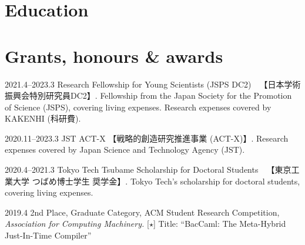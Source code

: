 \documentclass[11pt]{article} %
\newcommand{\伊澤侑祐}{\underline{伊澤侑祐}}
\begin{document}





\section*{Education}




\section*{Grants, honours \& awards}

\grant
{2021.4--2023.3}
{Research Fellowship for Young Scientists (JSPS DC2)~~【日本学術振興会特別研究員DC2】.}
{Fellowship from the Japan Society for the Promotion of Science (JSPS), covering
  living expenses. Research expenses covered by KAKENHI (科研費).}

\grant
{2020.11--2023.3}
{JST ACT-X 【戦略的創造研究推進事業 (ACT-X)】.}
{Research expenses covered by Japan Science and Technology Agency (JST).}

\grant
{2020.4--2021.3}
{Tokyo Tech Tsubame Scholarship for Doctoral Students~~【東京工業大学 つばめ博士学生
  奨学金】.}
{Tokyo Tech's scholarship for doctoral students, covering living expenses.}

\grant
{2019.4}
{2nd Place, Graduate Category, ACM Student Research Competition, \textit{Association for Computing Machinery.}
  [$\star$]}
{Title: ``BacCaml: The Meta-Hybrid Just-In-Time Compiler''}
\end{document}
